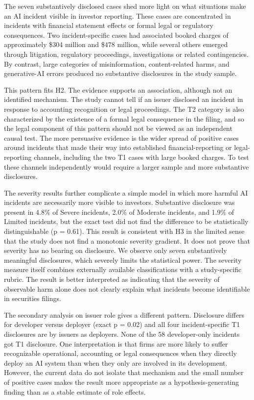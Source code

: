 \documentclass[utf8]{FrontiersinHarvard}
\begin{document}
The seven substantively disclosed cases shed more light on what situations make an AI incident visible in investor reporting. These cases are concentrated in incidents with financial statement effects or formal legal or regulatory consequences. Two incident-specific cases had associated booked charges of approximately \$304 million and \$478 million, while several others emerged through litigation, regulatory proceedings, investigations or related contingencies. By contrast, large categories of misinformation, content-related harms, and generative-AI errors produced no substantive disclosures in the study sample.

This pattern fits H2. The evidence supports an association, although not an identified mechanism. The study cannot tell if an issuer disclosed an incident in response to accounting recognition or legal proceedings. The T2 category is also characterized by the existence of a formal legal consequence in the filing, and so the legal component of this pattern should not be viewed as an independent causal test. The more persuasive evidence is the wider spread of positive cases around incidents that made their way into established financial-reporting or legal-reporting channels, including the two T1 cases with large booked charges. To test these channels independently would require a larger sample and more substantive disclosures.

The severity results further complicate a simple model in which more harmful AI incidents are necessarily more visible to investors. Substantive disclosure was present in 4.8\% of Severe incidents, 2.0\% of Moderate incidents, and 1.9\% of Limited incidents, but the exact test did not find the difference to be statistically distinguishable (p = 0.61). This result is consistent with H3 in the limited sense that the study does not find a monotonic severity gradient. It does not prove that severity has no bearing on disclosure. We observe only seven substantively meaningful disclosures, which severely limits the statistical power. The severity measure itself combines externally available classifications with a study-specific rubric. The result is better interpreted as indicating that the severity of observable harm alone does not clearly explain what incidents become identifiable in securities filings.

The secondary analysis on issuer role gives a different pattern. Disclosure differs for developer versus deployer (exact p = 0.02) and all four incident-specific T1 disclosures are by issuers as deployers. None of the 58 developer-only incidents got T1 disclosure. One interpretation is that firms are more likely to suffer recognizable operational, accounting or legal consequences when they directly deploy an AI system than when they only are involved in its development. However, the current data do not isolate that mechanism and the small number of positive cases makes the result more appropriate as a hypothesis-generating finding than as a stable estimate of role effects.
\end{document}
